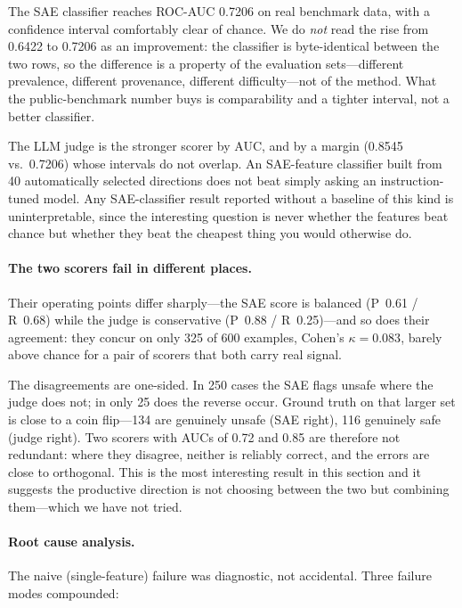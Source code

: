 \documentclass[11pt]{article}
\begin{document}
The SAE classifier reaches ROC-AUC 0.7206 on real benchmark data, with a confidence
interval comfortably clear of chance. We do \emph{not} read the rise from 0.6422 to
0.7206 as an improvement: the classifier is byte-identical between the two rows, so the
difference is a property of the evaluation sets---different prevalence, different
provenance, different difficulty---not of the method. What the public-benchmark number
buys is comparability and a tighter interval, not a better classifier.

The LLM judge is the stronger scorer by AUC, and by a margin (0.8545 vs.\ 0.7206) whose
intervals do not overlap. An SAE-feature classifier built from 40 automatically selected
directions does not beat simply asking an instruction-tuned model. Any SAE-classifier
result reported without a baseline of this kind is uninterpretable, since the interesting
question is never whether the features beat chance but whether they beat the cheapest
thing you would otherwise do.

\paragraph{The two scorers fail in different places.} Their operating points differ
sharply---the SAE score is balanced (P~0.61 / R~0.68) while the judge is conservative
(P~0.88 / R~0.25)---and so does their agreement: they concur on only 325 of 600
examples, Cohen's $\kappa = 0.083$, barely above chance for a pair of scorers that both
carry real signal.

The disagreements are one-sided. In 250 cases the SAE flags unsafe where the judge does
not; in only 25 does the reverse occur. Ground truth on that larger set is close to a
coin flip---134 are genuinely unsafe (SAE right), 116 genuinely safe (judge right). Two
scorers with AUCs of 0.72 and 0.85 are therefore not redundant: where they disagree,
neither is reliably correct, and the errors are close to orthogonal. This is the most
interesting result in this section and it suggests the productive direction is not
choosing between the two but combining them---which we have not tried.

\paragraph{Root cause analysis.} The naive (single-feature) failure was diagnostic, not accidental. Three failure modes compounded:
\end{document}
